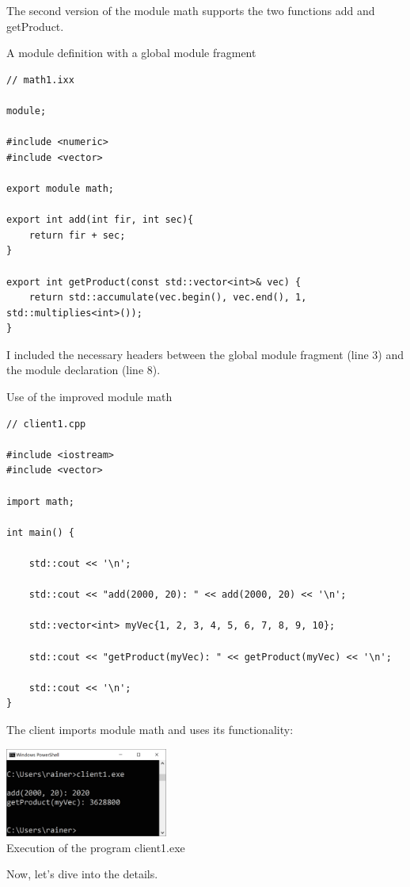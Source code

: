 The second version of the module math supports the two functions add and getProduct.

\noindent
A module definition with a global module fragment
\begin{lstlisting}[style=styleCXX]
// math1.ixx

module;

#include <numeric>
#include <vector>

export module math;

export int add(int fir, int sec){
	return fir + sec;
}

export int getProduct(const std::vector<int>& vec) {
	return std::accumulate(vec.begin(), vec.end(), 1, std::multiplies<int>());
}
\end{lstlisting}

I included the necessary headers between the global module fragment (line 3) and the module declaration (line 8).

\noindent
Use of the improved module math
\begin{lstlisting}[style=styleCXX]
// client1.cpp

#include <iostream>
#include <vector>

import math;

int main() {
	
	std::cout << '\n';
	
	std::cout << "add(2000, 20): " << add(2000, 20) << '\n';
	
	std::vector<int> myVec{1, 2, 3, 4, 5, 6, 7, 8, 9, 10};
	
	std::cout << "getProduct(myVec): " << getProduct(myVec) << '\n';
	
	std::cout << '\n';
}
\end{lstlisting}

The client imports module math and uses its functionality:

\begin{center}
\includegraphics[width=0.4\textwidth]{content/3/chapter4/images/17.png}\\
Execution of the program client1.exe
\end{center}

Now, let’s dive into the details.

